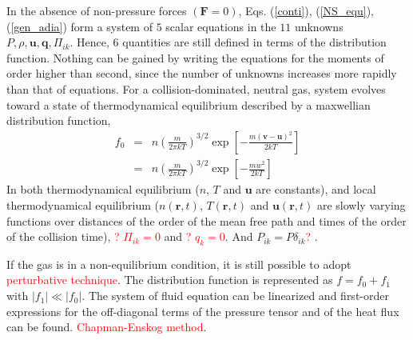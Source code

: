 \documentclass[12pt,a4paper]{article}
\renewcommand{\vec}[1]{\boldsymbol{#1}}
\begin{document}
In the absence of non-pressure forces $(\vec{F} = 0)$, Eqs. (\ref{conti}),  (\ref{NS_equ}),  (\ref{gen_adia}) form a system of $5$ scalar equations in the $11$ unknowns $P, \rho, \vec{u}, \vec{q},  \Pi_{ik}$. Hence, $6$ quantities are still defined in terms of the distribution function. Nothing can be gained by writing the equations for the moments of order higher than second, since the number of unknowns increases more rapidly than that of equations. For a collision-dominated, neutral gas, system evolves toward a state of thermodynamical equilibrium described by a maxwellian distribution function,
\begin{eqnarray*}
f_0 &=& n \left(\frac{m}{2\pi kT} \right)^{3/2} \exp\left[-\frac{m(\vec{v}-\vec{u})^2}{2kT} \right] \\
&=& n \left(\frac{m}{2\pi kT} \right)^{3/2} \exp\left[-\frac{m w^2}{2kT} \right]
\end{eqnarray*}
In both thermodynamical equilibrium ($n$, $T$ and $\vec{u}$ are constants), and local thermodynamical equilibrium ($n(\vec{r}, t)$, $T(\vec{r}, t)$ and $\vec{u}(\vec{r}, t)$ are slowly varying functions over distances of the order of the mean free path and times of the order of the collision time), \textcolor{red}{? $\Pi_{ik} = 0$} and \textcolor{red}{? $q_k = 0$}.  And $P_{ik} = P \delta_{ik}$\textcolor{red}{?} .

If the gas is in a non-equilibrium condition, it is still possible to adopt \textcolor{red}{perturbative technique}. The distribution function is represented as $f = f_0 + f_1$ with $|f_1| \ll |f_0|$. The system of fluid equation can be linearized and first-order expressions for the off-diagonal terms of the pressure tensor and of the heat flux can be found. \textcolor{red}{Chapman-Enskog method}.






































\end{document}
